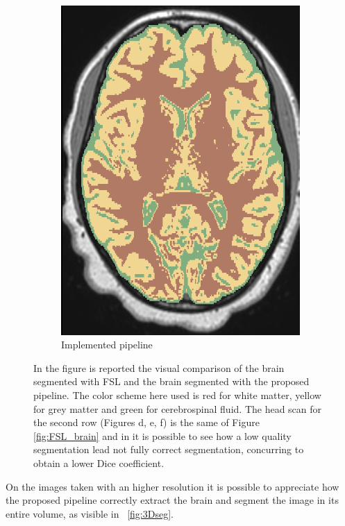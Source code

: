 \documentclass{standalone}
\begin{document}
\begin{figure}[H]
\begin{subfigure}[b]{0.325\textwidth}
             \includegraphics[scale=0.25]{img/Chap3/SEG54.png}
             \caption{Implemented pipeline}
        \end{subfigure}
        \caption{In the figure is reported the visual comparison of the brain segmented with FSL and the brain segmented with the proposed pipeline.
        The color scheme here used is red for white matter, yellow for grey matter and green for cerebrospinal fluid.
        The head scan for the second row (Figures d, e, f) is the same of Figure \ref{fig:FSL_brain} and in it is possible to see how a low quality segmentation lead not fully correct segmentation, concurring to obtain a lower Dice coefficient.}\label{fig:FSL_segmentation}
\end{figure}

On the images taken with an higher resolution it is possible to appreciate how the proposed pipeline correctly extract the brain and segment the image in its entire volume, as visible in \figureautorefname~\ref{fig:3Dseg}.
\end{document}
